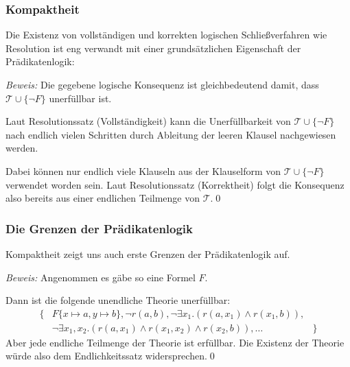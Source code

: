 \documentclass[aspectratio=1610,onlymath]{beamer}
\begin{document}
\begin{frame}\frametitle{Kompaktheit}

Die Existenz von vollständigen und korrekten logischen Schließverfahren wie Resolution
ist eng verwandt mit einer grundsätzlichen Eigenschaft der Prädikatenlogik:\bigskip

\pause

\small
\emph{Beweis:} Die gegebene logische Konsequenz ist gleichbedeutend damit, dass
$\mathcal{T}\cup\{\neg F\}$ unerfüllbar ist.\medskip

Laut Resolutionssatz (Vollständigkeit) kann die Unerfüllbarkeit von $\mathcal{T}\cup\{\neg F\}$ nach endlich vielen Schritten durch Ableitung der leeren Klausel nachgewiesen werden.\medskip

Dabei können nur endlich viele Klauseln aus der Klauselform von $\mathcal{T}\cup\{\neg F\}$ verwendet worden sein. Laut Resolutionssatz (Korrektheit) folgt die Konsequenz also bereits aus einer endlichen Teilmenge von $\mathcal{T}$.\qed

\end{frame}

\begin{frame}\frametitle{Die Grenzen der Prädikatenlogik}

Kompaktheit zeigt uns auch erste Grenzen der Prädikatenlogik auf.
\smallskip

\pause

\pause

\emph{Beweis:} Angenommen es gäbe so eine Formel $F$.\medskip

Dann ist die folgende unendliche Theorie unerfüllbar:
\[\begin{array}{rll}
\big\{ & F\{x\mapsto a,y\mapsto b\},\neg r(a,b), \neg \exists x_1.(r(a,x_1)\wedge r(x_1,b)),\\
& \neg\exists x_1,x_2.(r(a,x_1)\wedge
r(x_1,x_2)\wedge r(x_2,b)),\ldots & \big\}
\end{array}\]
Aber jede endliche Teilmenge der Theorie ist erfüllbar.
Die Existenz der Theorie würde also dem Endlichkeitssatz widersprechen.\qed

\end{frame}
\end{document}
